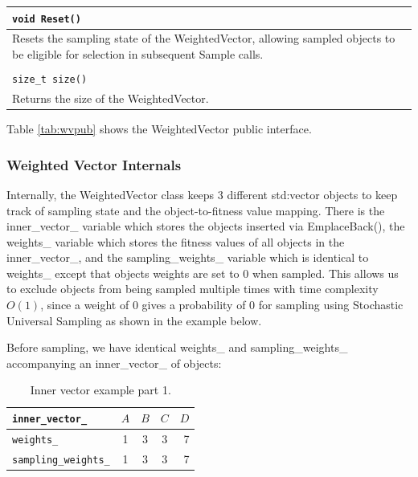 \documentclass[12pt]{article}
\begin{document}
\begin{table}[htbp]
\begin{tabular}{ | p{1.0\linewidth} | }
      \\ \hline

      \verb|void Reset()|\\ \hline

      Resets the sampling state of the WeightedVector, allowing sampled objects
      to be eligible for selection in subsequent Sample calls.\\ \hline

      \\ \hline

      \verb|size_t size()|\\ \hline

      Returns the size of the WeightedVector.\\ \hline
    \end{tabular}
  \end{table}

  Table \ref{tab:wvpub} shows the WeightedVector public interface.

    \subsubsection{Weighted Vector Internals}

    Internally, the WeightedVector class keeps 3 different std:vector objects
    to keep track of sampling state and the object-to-fitness value mapping.
    There is the inner\_vector\_ variable which stores the objects
    inserted via EmplaceBack(), the weights\_ variable which stores the
    fitness values of all objects in the inner\_vector\_, and the
    sampling\_weights\_ variable which is identical to weights\_
    except that objects weights are set to 0 when sampled. This allows us to
    exclude objects from being sampled multiple times with time complexity
    $O(1)$, since a weight of 0 gives a probability of 0 for sampling using
    Stochastic Universal Sampling as shown in the example below.

    Before sampling, we have identical weights\_ and sampling\_weights\_
    accompanying an inner\_vector\_ of objects:

    \begin{table}[htbp]
      \caption{Inner vector example part 1.}
      \begin{center}
      \begin{tabular}{ | l | c | c | c | r | }
        \hline
        \verb|inner_vector_| & $A$ & $B$ & $C$ & $D$ \\ \hline
        \verb|weights_| & 1 & 3 & 3 & 7 \\ \hline
        \verb|sampling_weights_| & 1 & 3 & 3 & 7 \\ \hline
        \hline
      \end{tabular}
      \end{center}
    \end{table}
\end{document}
